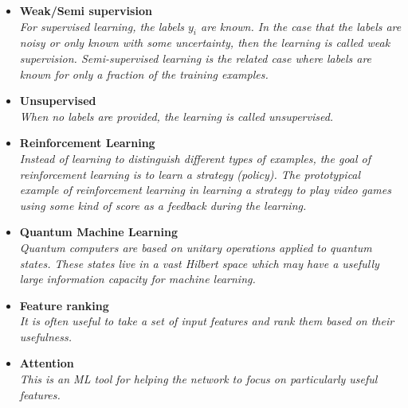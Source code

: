 \documentclass[12pt,letterpaper]{article}
\begin{document}
\begin{itemize}
\begin{itemize}
\begin{itemize}
				\item \textbf{Weak/Semi supervision}~\cite{Dery:2017fap,Metodiev:2017vrx,Komiske:2018oaa,Collins:2018epr,Collins:2019jip,Borisyak:2019vbz,Cohen:2017exh,Komiske:2018vkc,Metodiev:2018ftz,collaboration2020dijet,Amram:2020ykb,Brewer:2020och,Dahbi:2020zjw,Lee:2019ssx,Lieberman:2021krq,Komiske:2022vxg,Li:2022omf,LeBlanc:2022bwd}
				\\\textit{For supervised learning, the labels $y_i$ are known.  In the case that the labels are noisy or only known with some uncertainty, then the learning is called weak supervision.  Semi-supervised learning is the related case where labels are known for only a fraction of the training examples.}
				\item \textbf{Unsupervised}~\cite{Mackey:2015hwa,Komiske:2019fks,1797846,Dillon:2019cqt,Cai:2020vzx,Howard:2021pos,Dillon:2021gag}
				\\\textit{When no labels are provided, the learning is called unsupervised.}
				\item \textbf{Reinforcement Learning}~\cite{Carrazza:2019efs,Brehmer:2020brs,John:2020sak,Harvey:2021oue,Cranmer:2021gdt,Windisch:2021mem}
				\\\textit{Instead of learning to distinguish different types of examples, the goal of reinforcement learning is to learn a strategy (policy).  The prototypical example of reinforcement learning in learning a strategy to play video games using some kind of score as a feedback during the learning.}
				\item \textbf{Quantum Machine Learning}~\cite{Mott:2017xdb,Zlokapa:2019lvv,Blance:2020nhl,Terashi:2020wfi,Chen:2020zkj,Wu:2020cye,Guan:2020bdl,Chen:2021ouz,Blance:2021gcs,Heredge:2021vww,Wu:2021xsj,Belis:2021zqi,Araz:2021ifk,Bravo-Prieto:2021ehz,Kim:2021wrr,Ngairangbam:2021yma,Gianelle:2022unu,Abel:2022lqr,Araz:2022haf,Delgado:2022aty,Alvi:2022fkk,Peixoto:2022zzk,Araz:2022zxk}
				\\\textit{Quantum computers are based on unitary operations applied to quantum states.  These states live in a vast Hilbert space which may have a usefully large information capacity for machine learning.}
				\item \textbf{Feature ranking}~\cite{Faucett:2020vbu,Grojean:2020ech}
				\\\textit{It is often useful to take a set of input features and rank them based on their usefulness.}
				\item \textbf{Attention}~\cite{goto2021development}
				\\\textit{This is an ML tool for helping the network to focus on particularly useful features.}

\end{itemize}
\end{itemize}
\end{itemize}
\end{document}
